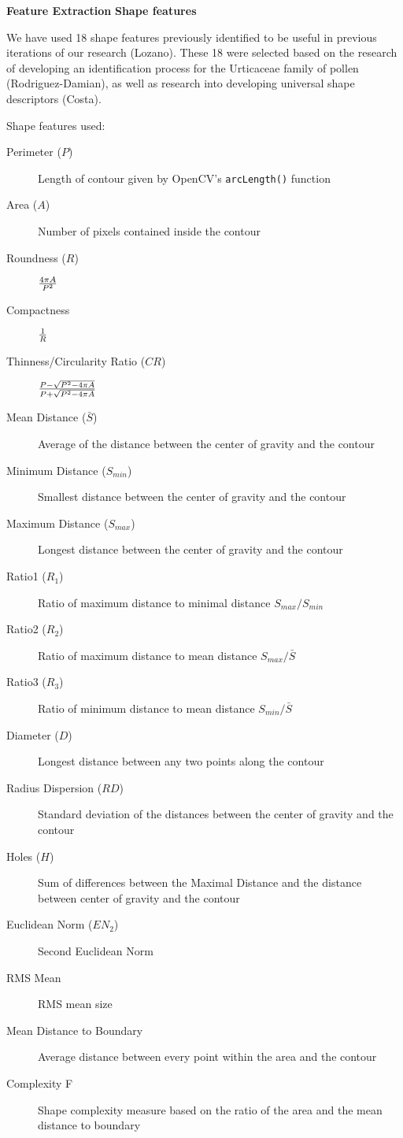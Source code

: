 \textbf{Feature Extraction}
\textbf{Shape features}

We have used 18 shape features previously identified to be useful in previous iterations of our research (Lozano). These 18 were selected based on the research of developing an identification process for the Urticaceae family of pollen (Rodriguez-Damian), as well as research into developing universal shape descriptors (Costa).

Shape features used:

\begin{description}
\item[Perimeter ($P$)] Length of contour given by OpenCV's \verb|arcLength()| function
\item[Area ($A$)] Number of pixels contained inside the contour
\item[Roundness ($R$)] $4\pi A \over P^2$
\item[Compactness] $1 \over R$
\item[Thinness/Circularity Ratio ($CR$)] $P-\sqrt{P^2-4\pi A} \over P+\sqrt{P^2-4\pi A}$
\item[Mean Distance ($\bar{S}$)] Average of the distance between the center of gravity and the contour
\item[Minimum Distance ($S_{min}$)] Smallest distance between the center of gravity and the contour
\item[Maximum Distance ($S_{max}$)] Longest distance between the center of gravity and the contour
\item[Ratio1 ($R_1$)] Ratio of maximum distance to minimal distance $S_{max} / S_{min}$
\item[Ratio2 ($R_2$)] Ratio of maximum distance to mean distance $S_{max} / \bar{S}$
\item[Ratio3 ($R_3$)] Ratio of minimum distance to mean distance $S_{min}/ \bar{S}$
\item[Diameter ($D$)] Longest distance between any two points along the contour
\item[Radius Dispersion ($RD$)] Standard deviation of the distances between the center of gravity and the contour
\item[Holes ($H$)] Sum of differences between the Maximal Distance and the distance between center of gravity and the contour
\item[Euclidean Norm ($EN_2$)] Second Euclidean Norm
\item[RMS Mean] RMS mean size
\item[Mean Distance to Boundary] Average distance between every point within the area and the contour
\item[Complexity F] Shape complexity measure based on the ratio of the area and the mean distance to boundary
\end{description}



  
  
  
  
  
  
  